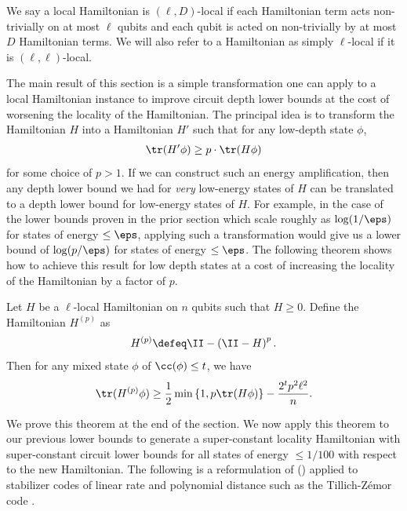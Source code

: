 \documentclass{toc}
\begin{document}
\begin{definition}
We say a local Hamiltonian is $(\ell, D)$-local if each Hamiltonian term acts non-trivially on at most $\ell$ qubits and each qubit is acted on non-trivially by at most $D$ Hamiltonian terms. We will also refer to a Hamiltonian as simply $\ell$-local if it is $(\ell, \ell)$-local.
\end{definition}
The main result of this section is a simple transformation one can apply to a local Hamiltonian instance to improve circuit depth lower bounds at the cost of worsening the locality of the Hamiltonian. The principal idea is to transform the Hamiltonian $H$ into a Hamiltonian $H'$ such that for any low-depth state $\phi$, 
\begin{align}\tr(H' \phi) \geq p \cdot \tr(H \phi)
\end{align}
for some choice of $p > 1$. If we can construct such an energy amplification, then any depth lower bound we had for \emph{very} low-energy states of $H$ can be translated to a depth lower bound for low-energy states of $H$. For example, in the case of the lower bounds proven in the prior section which scale roughly as $\log (1/\eps)$ for states of energy $\leq \eps $, applying such a transformation would give us a lower bound of $\log(p/\eps)$ for states of energy $\leq \eps$.
The following theorem shows how to achieve this result for low depth states at a cost of increasing the locality of the Hamiltonian by a factor of $p$. 


\begin{theorem}
Let $H$ be a $\ell$-local Hamiltonian on $n$ qubits such that $H \geq 0$. Define the Hamiltonian $H^{(p)}$ as
\begin{align}
    H^{(p)} \defeq  \II - \left( \II - H \right)^p.
\end{align}
Then for any mixed state $\phi$ of $\cc(\phi) \leq t$, we have
\begin{align}
    \tr(H^{(p)} \phi) \geq \frac{1}{2} \min \left\{1, p \tr(H \phi ) \right\} - \frac{2^t p^2\ell^2}{n}.
\end{align}
\label{thm:amplification}
\end{theorem}
We prove this theorem at the end of the section. We now apply this theorem to our previous lower bounds to generate a super-constant locality Hamiltonian with super-constant circuit lower bounds for all states of energy $\leq 1/100$ with respect to the new Hamiltonian. The following is a reformulation of  () applied to stabilizer codes of linear rate and polynomial distance such as the Tillich-Z\'emor code \cite{5205648}.
\end{document}
